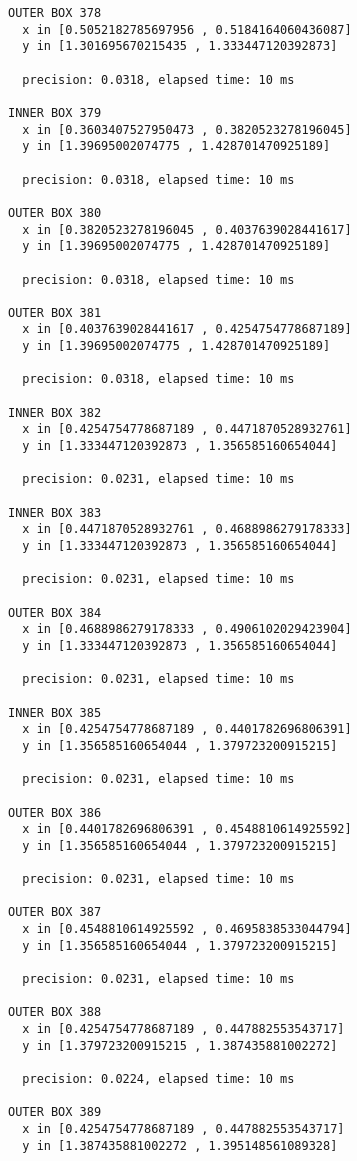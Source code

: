 \begin{verbatim}
OUTER BOX 378
  x in [0.5052182785697956 , 0.5184164060436087]
  y in [1.301695670215435 , 1.333447120392873]

  precision: 0.0318, elapsed time: 10 ms

INNER BOX 379
  x in [0.3603407527950473 , 0.3820523278196045]
  y in [1.39695002074775 , 1.428701470925189]

  precision: 0.0318, elapsed time: 10 ms

OUTER BOX 380
  x in [0.3820523278196045 , 0.4037639028441617]
  y in [1.39695002074775 , 1.428701470925189]

  precision: 0.0318, elapsed time: 10 ms

OUTER BOX 381
  x in [0.4037639028441617 , 0.4254754778687189]
  y in [1.39695002074775 , 1.428701470925189]

  precision: 0.0318, elapsed time: 10 ms

INNER BOX 382
  x in [0.4254754778687189 , 0.4471870528932761]
  y in [1.333447120392873 , 1.356585160654044]

  precision: 0.0231, elapsed time: 10 ms

INNER BOX 383
  x in [0.4471870528932761 , 0.4688986279178333]
  y in [1.333447120392873 , 1.356585160654044]

  precision: 0.0231, elapsed time: 10 ms

OUTER BOX 384
  x in [0.4688986279178333 , 0.4906102029423904]
  y in [1.333447120392873 , 1.356585160654044]

  precision: 0.0231, elapsed time: 10 ms

INNER BOX 385
  x in [0.4254754778687189 , 0.4401782696806391]
  y in [1.356585160654044 , 1.379723200915215]

  precision: 0.0231, elapsed time: 10 ms

OUTER BOX 386
  x in [0.4401782696806391 , 0.4548810614925592]
  y in [1.356585160654044 , 1.379723200915215]

  precision: 0.0231, elapsed time: 10 ms

OUTER BOX 387
  x in [0.4548810614925592 , 0.4695838533044794]
  y in [1.356585160654044 , 1.379723200915215]

  precision: 0.0231, elapsed time: 10 ms

OUTER BOX 388
  x in [0.4254754778687189 , 0.447882553543717]
  y in [1.379723200915215 , 1.387435881002272]

  precision: 0.0224, elapsed time: 10 ms

OUTER BOX 389
  x in [0.4254754778687189 , 0.447882553543717]
  y in [1.387435881002272 , 1.395148561089328]


\end{verbatim}
